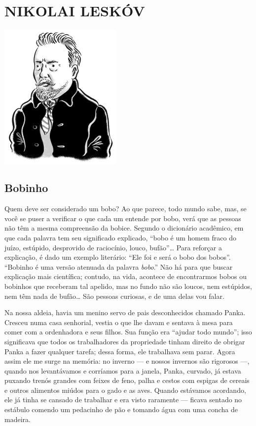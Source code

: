 \part[NIKOLAI LESKÓV]{NIKOLAI LESKÓV }

\pagebreak
\thispagestyle{empty}
\mbox{}
\vfill
\begin{center}
\includegraphics[width=6cm]{./imgs/autor5.jpg}
\end{center}


\chapter{Bobinho} \label{part5}

Quem deve ser considerado um bobo? Ao que parece, todo mundo sabe, mas,
se você se puser a verificar o que cada um entende por bobo, verá que as
pessoas não têm a mesma compreensão da bobice. Segundo o dicionário
acadêmico, em que cada palavra tem seu significado explicado, ``bobo é
um homem fraco do juízo, estúpido, desprovido de raciocínio, louco,
bufão''\ldots{} Para reforçar a explicação, é dado um exemplo literário:
``Ele foi e será o bobo dos bobos''. ``Bobinho é uma versão atenuada da
palavra \emph{bobo}.'' Não há para que buscar explicação mais
científica; contudo, na vida, acontece de encontrarmos bobos ou bobinhos
que receberam tal apelido, mas no fundo não são loucos, nem estúpidos,
nem têm nada de bufão\ldots{} São pessoas curiosas, e de uma delas vou falar.

Na nossa aldeia, havia um menino servo de pais desconhecidos chamado
Panka. Cresceu numa casa senhorial, vestia o que lhe davam e sentava à
mesa para comer com a ordenhadora e seus filhos. Sua função era ``ajudar
todo mundo''; isso significava que todos os trabalhadores da propriedade
tinham direito de obrigar Panka a fazer qualquer tarefa; dessa forma,
ele trabalhava sem parar. Agora assim ele me surge na memória: no
inverno --- e nossos invernos são rigorosos ---, quando nos levantávamos
e corríamos para a janela, Panka, curvado, já estava puxando trenós
grandes com feixes de feno, palha e cestos com espigas de cereais e
outros alimentos miúdos para o gado e as aves. Quando estávamos
acordando, ele já tinha se cansado de trabalhar e era visto raramente
--- ficava sentado no estábulo comendo um pedacinho de pão e tomando
água com uma concha de madeira.

